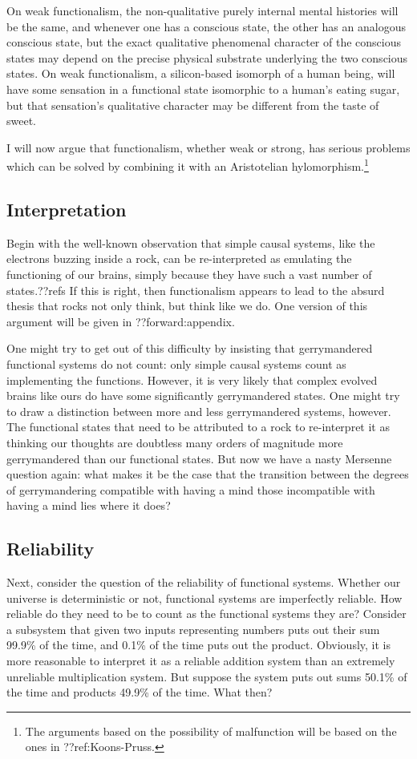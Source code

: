 On weak functionalism, the non-qualitative purely internal mental histories will be the same, and whenever one has a conscious state, 
the other has an analogous conscious state, but the exact qualitative phenomenal character of the conscious states may depend on 
the precise physical substrate underlying the two conscious states. On weak functionalism, a silicon-based isomorph of a human being,
will have some sensation in a functional state isomorphic to a human's eating sugar, but that sensation's qualitative character may
be different from the taste of sweet. 

I will now argue that functionalism, whether weak or strong, has serious problems which can be solved by combining it with an Aristotelian hylomorphism.\footnote{The arguments
based on the possibility of malfunction will be based on the ones in ??ref:Koons-Pruss.} 

\subsection{Interpretation}
Begin with the well-known observation that simple causal systems, like the electrons buzzing inside a rock, can be re-interpreted as 
emulating the functioning of our brains, simply because they have such a vast number of states.??refs If this is right, then functionalism 
appears to lead to the absurd thesis that rocks not only think, but think like we do. One version of this argument will be given in ??forward:appendix. 

One might try to get out of this difficulty by insisting that gerrymandered functional systems do not count: only simple causal
systems count as implementing the functions. However, it is very likely that complex evolved brains like ours do have some significantly
gerrymandered states. One might try to draw a distinction between more and less gerrymandered systems, however. The functional states 
that need to be attributed to a rock to re-interpret it as thinking our thoughts are doubtless many orders of magnitude more gerrymandered
than our functional states. But now we have a nasty Mersenne question again: what makes it be the case that the transition between the degrees
of gerrymandering compatible with having a mind those incompatible with having a mind lies where it does?

\subsection{Reliability}
Next, consider the question of the reliability of functional systems. Whether our universe is deterministic or not, functional systems are imperfectly reliable.
How reliable do they need to be to count as the functional systems they are? Consider a subsystem that given two inputs representing numbers
puts out their sum 99.9\% of the time, and 0.1\% of the time puts out the product. Obviously, it is more reasonable to interpret it as 
a reliable addition system than an extremely unreliable multiplication system. But suppose the system puts out sums 50.1\% of the time
and products 49.9\% of the time. What then? 

